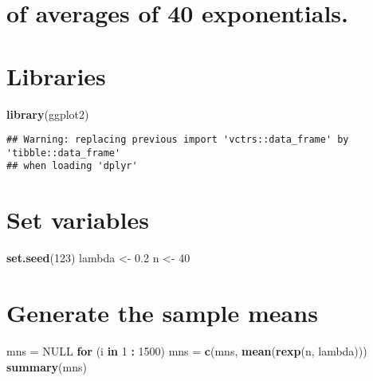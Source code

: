 \documentclass[
]{article}
\newenvironment{Shaded}{\begin{snugshade}}{\end{snugshade}}
\newcommand{\ControlFlowTok}[1]{\textcolor[rgb]{0.13,0.29,0.53}{\textbf{#1}}}
\newcommand{\DecValTok}[1]{\textcolor[rgb]{0.00,0.00,0.81}{#1}}
\newcommand{\FloatTok}[1]{\textcolor[rgb]{0.00,0.00,0.81}{#1}}
\newcommand{\KeywordTok}[1]{\textcolor[rgb]{0.13,0.29,0.53}{\textbf{#1}}}
\newcommand{\NormalTok}[1]{#1}
\newcommand{\OperatorTok}[1]{\textcolor[rgb]{0.81,0.36,0.00}{\textbf{#1}}}
\newcommand{\OtherTok}[1]{\textcolor[rgb]{0.56,0.35,0.01}{#1}}
\newcommand{\StringTok}[1]{\textcolor[rgb]{0.31,0.60,0.02}{#1}}
\begin{document}
\hypertarget{of-averages-of-40-exponentials.}{%
\section{of averages of 40
exponentials.}\label{of-averages-of-40-exponentials.}}

\hypertarget{libraries}{%
\section{Libraries}\label{libraries}}

\begin{Shaded}
\begin{Highlighting}[]
\KeywordTok{library}\NormalTok{(ggplot2)}
\end{Highlighting}
\end{Shaded}

\begin{verbatim}
## Warning: replacing previous import 'vctrs::data_frame' by 'tibble::data_frame'
## when loading 'dplyr'
\end{verbatim}

\hypertarget{set-variables}{%
\section{Set variables}\label{set-variables}}

\begin{Shaded}
\begin{Highlighting}[]
\KeywordTok{set.seed}\NormalTok{(}\DecValTok{123}\NormalTok{)}
\NormalTok{lambda <-}\StringTok{ }\FloatTok{0.2}
\NormalTok{n <-}\StringTok{ }\DecValTok{40}
\end{Highlighting}
\end{Shaded}

\hypertarget{generate-the-sample-means}{%
\section{Generate the sample means}\label{generate-the-sample-means}}

\begin{Shaded}
\begin{Highlighting}[]
\NormalTok{mns =}\StringTok{ }\OtherTok{NULL}
\ControlFlowTok{for}\NormalTok{ (i }\ControlFlowTok{in} \DecValTok{1} \OperatorTok{:}\StringTok{ }\DecValTok{1500}\NormalTok{) mns =}\StringTok{ }\KeywordTok{c}\NormalTok{(mns, }\KeywordTok{mean}\NormalTok{(}\KeywordTok{rexp}\NormalTok{(n, lambda)))}
\KeywordTok{summary}\NormalTok{(mns)}
\end{Highlighting}
\end{Shaded}
\end{document}
